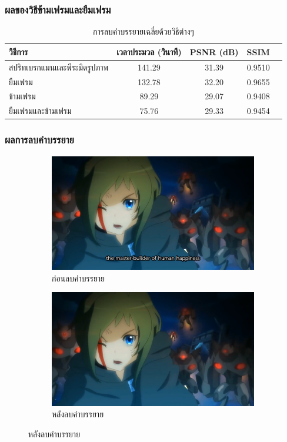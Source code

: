 \documentclass[xcolor=dvipsnames, xetex,serif]{beamer}
\numberwithin{equation}{section}
\begin{document}
		\begin{frame}
			\frametitle{ผลของวิธีข้ามเฟรมและยืมเฟรม}
			\begin{table}[H]
				\centering
				\begin{tabular}[ht]{|l|c|c|c|c|}
					\hline
					วิธีการ  & เวลาประมวล  (วินาที) & PSNR (dB) & SSIM \\
					\hline
					สปริทเบรกแมนและพีระมิดรูปภาพ & 141.29 & 31.39  &  0.9510\\
					ยืมเฟรม & 132.78 & 32.20 & 0.9655\\
					ข้ามเฟรม & 89.29 & 29.07 & 0.9408 \\
					ยืมเฟรมและข้ามเฟรม & 75.76 & 29.33 & 0.9454 \\
					\hline
				\end{tabular}
				\caption{การลบคำบรรยายเฉลี่ยด้วยวิธีต่างๆ}
			\end{table}	
		\end{frame}
		\begin{frame}
			\frametitle{ผลการลบคำบรรยาย}
			\begin{figure}[H]
				\centering
				\begin{subfigure}{0.4\linewidth}
					\centering
					\includegraphics[width=0.80\linewidth]{images/subtitle-remove/beforesubtitleremove.png}
					\caption{ก่อนลบคำบรรยาย}
					\label{image:ssim_location_prev}
				\end{subfigure}
				\begin{subfigure}{0.4\linewidth}
					\centering
					\includegraphics[width=0.80\linewidth]{images/subtitle-remove/aftersubtitleremove.png}
					\caption{หลังลบคำบรรยาย}
					\label{image:ssim_location_curr}
				\end{subfigure}
			\end{figure}
		\end{frame}
\end{document}
